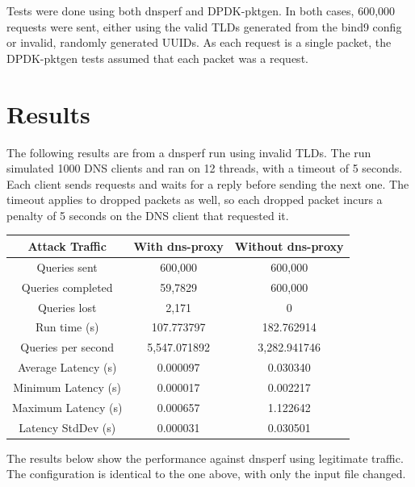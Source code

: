 \documentclass[12pt]{extarticle}
\begin{document}
Tests were done using both dnsperf and DPDK-pktgen. In both cases, 600,000 requests were sent, either using the valid TLDs generated from the bind9 config or invalid, randomly generated UUIDs. As each request is a single packet, the DPDK-pktgen tests assumed that each packet was a request. \\

\section{Results}

The following results are from a dnsperf run using invalid TLDs. The run simulated 1000 DNS clients and ran on 12 threads, with a timeout of 5 seconds. Each client sends requests and waits for a reply before sending the next one. The timeout applies to dropped packets as well, so each dropped packet incurs a penalty of 5 seconds on the DNS client that requested it. \\

\begin{center}
\begin{tabular}{ ||c|c|c|| }
\hline
Attack Traffic & With dns-proxy & Without dns-proxy \\
\hline
Queries sent & 600,000 & 600,000 \\
Queries completed & 59,7829 & 600,000 \\
Queries lost & 2,171 & 0 \\
Run time (s) & 107.773797 & 182.762914 \\
Queries per second & 5,547.071892 & 3,282.941746 \\
Average Latency (s) & 0.000097 & 0.030340 \\
Minimum Latency (s) & 0.000017 & 0.002217 \\
Maximum Latency (s) & 0.000657 & 1.122642 \\
Latency StdDev (s) & 0.000031 & 0.030501 \\
\hline
\end{tabular}
\end{center}

The results below show the performance against dnsperf using legitimate traffic. The configuration is identical to the one above, with only the input file changed. \\
\end{document}
